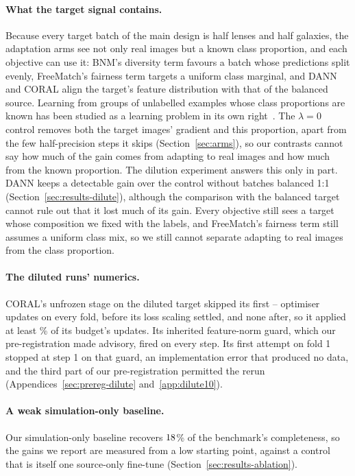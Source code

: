 \paragraph{What the target signal contains.} Because every target batch of the main design is
half lenses and half galaxies, the adaptation arms see not only real images but a known class
proportion, and each
objective can use it: BNM's diversity term favours a batch whose predictions split evenly,
FreeMatch's fairness term targets a uniform class marginal, and DANN and CORAL align the
target's feature distribution with that of the balanced source. Learning from groups of
unlabelled examples whose class proportions are known has been studied as a learning problem in
its own right~\citep{quadrianto2009}. The $\lambda = 0$ control removes both the target images'
gradient and this proportion, apart from the few half-precision steps it skips
(Section~\ref{sec:arms}), so our contrasts cannot say how much of the gain comes from
adapting to real images and how much from the known proportion. The dilution experiment answers
this only in part. DANN keeps a detectable gain over the control without batches balanced 1:1
(Section~\ref{sec:results-dilute}), although the comparison with the balanced target cannot
rule out that it lost much of its gain. Every objective still sees a target whose composition
we fixed with the labels, and FreeMatch's fairness term still assumes a uniform class mix, so
we still cannot separate adapting to real images from the class proportion.

\paragraph{The diluted runs' numerics.} CORAL's unfrozen stage on the diluted target skipped its
first \dlCoralSkipMin{}--\dlCoralSkipMax{} optimiser updates on every fold, before its loss
scaling settled, and none after, so it applied at least \dlCoralAppliedPct{}\% of its budget's
updates. Its inherited
feature-norm guard, which our pre-registration made advisory, fired on every step. Its first
attempt on fold 1 stopped at step 1 on that guard, an implementation error that produced no
data, and the third part of our pre-registration permitted the rerun
(Appendices~\ref{sec:prereg-dilute} and~\ref{app:dilute10}).

\paragraph{A weak simulation-only baseline.} Our simulation-only baseline recovers
$18{}$\% of the benchmark's completeness, so the
gains we report are measured from a low starting point, against a control that is itself one
source-only fine-tune (Section~\ref{sec:results-ablation}).


